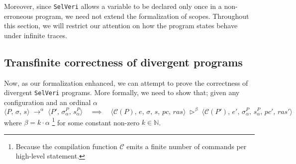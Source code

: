\documentclass{article}
\begin{document}
Moreover, since \texttt{SelVeri} allows a variable to be declared only once in a non-erroneous program, we need not extend the formalization of scopes. Throughout this section, we will restrict our attention on how the program states behave under infinite traces.

\subsection{Transfinite correctness of divergent programs}

Now, as our formalization enhanced, we can attempt to prove the correctness of divergent \texttt{SelVeri} programs. More formally, we need to show that; given any configuration and an ordinal $\alpha$ 
\[
\langle P,\, \sigma,\, s \rangle \; \rightarrow^\alpha \; \langle P',\, \sigma^P_\alpha,\, s^P_\alpha \rangle \quad \implies \quad 
\langle \mathcal{C}(P),\, e,\, \sigma,\, s,\, pc,\, ras \rangle \; \triangleright^\beta \; \langle \mathcal{C}(P'),\, e',\, \sigma^P_\alpha,\, s^P_\alpha,\, pc',\, ras' \rangle 
\] where $\beta = k  \cdot \alpha$ \footnote{Because the compilation function $\mathcal{C}$ emits a finite number of commands per high-level statement.} for some constant non-zero $k \in \mathbb{N}$. 
\end{document}
